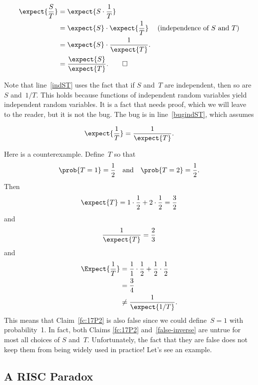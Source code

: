 \begin{falseproof}
\begin{align}
\expect{\frac{S}{T}} & = \expect{S \cdot \frac{1}{T}} \notag\\
       & = \expect{S} \cdot \expect{\frac{1}{T}} & \text{(independence of $S$
       and $T$)}\label{indST}\\
      & = \expect{S} \cdot \frac{1}{\expect{T}}. \label{bugindST}\\
      & = \frac{\expect{S}}{\expect{T}}.\notag \qedhere
\end{align}
\end{falseproof}
Note that line~\ref{indST} uses the fact that if $S$ and~$T$ are
independent, then so are $S$ and~$1/T$.  This holds because functions
of independent random variables yield independent random variables.
It is a fact that needs proof, which we will leave to the reader, but
it is not the bug. The bug is in line~\eqref{bugindST}, which assumes
\begin{falseclm}\label{false-inverse}
\[
\expect{\frac{1}{T}} =  \frac{1}{\expect{T}}.
\]
\end{falseclm}

Here is a counterexample.  Define~$T$ so that
\begin{equation*}
    \prob{T = 1} = \frac{1}{2} \quad\text{and}\quad
    \prob{T = 2} = \frac{1}{2}.
\end{equation*}
Then
\begin{equation*}
    \expect{T} = 1 \cdot \frac{1}{2} + 2 \cdot \frac{1}{2} =
    \frac{3}{2}
\end{equation*}
and
\begin{equation*}
    \frac{1}{\expect{T}} = \frac{2}{3}
\end{equation*}
and
\begin{align*}
\Expect{\frac{1}{T}}
    &= \frac{1}{1} \cdot \frac{1}{2} + \frac{1}{2} \cdot \frac{1}{2} \\
    &= \frac{3}{4} \\
    &\ne \frac{1}{\expect{1/T}}.
\end{align*}
This means that Claim~\ref{fc:17P2} is also false since we could
define~$S = 1$ with probability~1.  In fact, both Claims \ref{fc:17P2}
and~\ref{false-inverse} are untrue for most all choices of $S$
and~$T$.  Unfortunately, the fact that they are false does not keep
them from being widely used in practice!  Let's see an example.

\subsection{A RISC Paradox}

